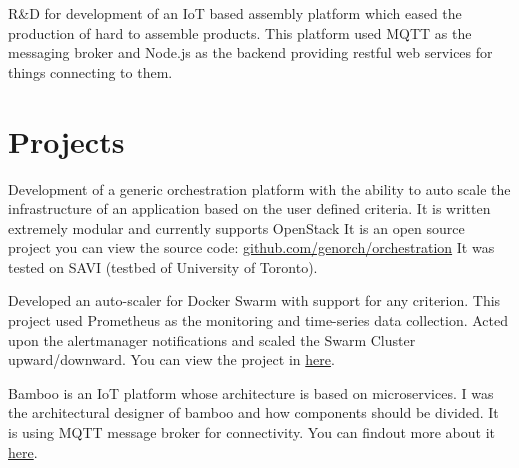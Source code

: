 \documentclass[]{deedy-resume-openfont}
\begin{document}
\begin{minipage}[t]{0.66\textwidth}
\begin{tightemize}
    \item R\&D for development of an IoT based assembly platform which eased
        the production of hard to assemble products. This platform used MQTT
        as the messaging broker and Node.js as the backend providing restful
        web services for things connecting to them.
    \end{tightemize}

\sectionsep

\section{Projects}
    Development of a generic orchestration platform with the ability to
    auto scale the infrastructure of an application based on the user defined
    criteria. It is written extremely modular and currently supports OpenStack
    It is an open source project you can view the source code: \href{https://github.com/genorch/orchestration}{github.com/genorch/orchestration}
    It was tested on SAVI (testbed of University of Toronto).
\sectionsep

    Developed an auto-scaler for Docker Swarm with support for any criterion. This project used Prometheus as the monitoring and time-series data collection. Acted upon the alertmanager notifications and scaled the Swarm Cluster upward/downward. You can view the project in \href{https://github.com/Tabrizian/swascale}{here}.

\sectionsep

    Bamboo is an IoT platform whose architecture is based on microservices.
    I was the architectural designer of bamboo and how components should be
    divided. It is using MQTT message broker for connectivity.
    You can findout more about it \href{https://github.com/bambil/bamboo}{here}.
\sectionsep



% 
% 

\end{minipage}
\end{document}
